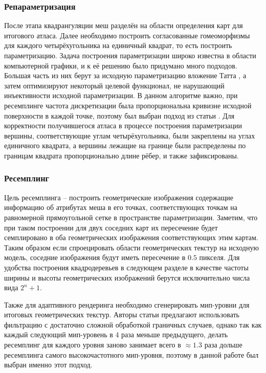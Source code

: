 \documentclass{article}
\begin{document}
\subsubsection{Репараметризация}
После этапа квадрангуляции меш разделён на области определения карт для итогового атласа. Далее необходимо построить согласованные гомеоморфизмы для каждого четырёхугольника на единичный квадрат, то есть построить параметризацию. Задача построения параметризации широко известна в области компьютерной графики, и к её решению было придумано много подходов. Большая часть из них берут за исходную параметризацию вложение Татта \cite{tutte1963}, а затем оптимизируют некоторый целевой функционал, не нарушающий инъективности исходной параметризации. В данном алгоритме важно, при ресемплинге частота дискретизации была пропорциональна кривизне исходной поверхности в каждой точке, поэтому был выбран подход из статьи \cite{sander2001}. Для корректности получившегося атласа в процессе построения параметризации вершины, соответствующие углам четырёхугольника, были закреплены на углах единичного квадрата, а вершины лежащие на границе были распределены по границам квадрата пропорционально длине рёбер, и также зафиксированы.

\subsubsection{Ресемплинг}
Цель ресемплинга -- построить геометрические изображения содержащие информацию об атрибутах меша в его точках, соответствующих точкам на равномерной прямоугольной сетке в пространстве параметризации. Заметим, что при таком построении для двух соседних карт их пересечение будет семплировано в оба геометрических изображения соответствующих этим картам. Таким образом если спроецировать области геометрических текстур на исходную модель, соседние изображения будут иметь пересечение в $0.5$ пикселя. Для удобства построения квадродеревьев в следующем разделе в качестве частоты ширины и высоты геометрических изображений берутся исключительно числа вида $2^n + 1$.

Также для адаптивного рендеринга необходимо сгенерировать мип-уровни для итоговых геометрических текстур. Авторы статьи \cite{purnomo2004} предлагают использовать фильтрацию с достаточно сложной обработкой граничных случаев, однако так как каждый следующий мип-уровень в 4 раза меньше предыдущего, делать ресемплинг для каждого уровня заново занимает всего в $\approx1.3$ раза дольше ресемплинга самого высокочастотного мип-уровня, поэтому в данной работе был выбран именно этот подход.
\end{document}
